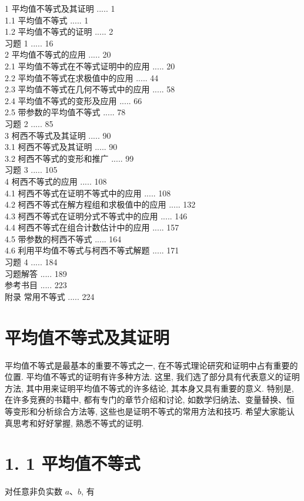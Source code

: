 1 平均值不等式及其证明 ..... 1\\
1.1 平均值不等式 ..... 1\\
1.2 平均值不等式的证明 ..... 2\\
习题 1 ..... 16\\
2 平均值不等式的应用 ..... 20\\
2.1 平均值不等式在不等式证明中的应用 ..... 20\\
2.2 平均值不等式在求极值中的应用 ..... 44\\
2.3 平均值不等式在几何不等式中的应用 ..... 58\\
2.4 平均值不等式的变形及应用 ..... 66\\
2.5 带参数的平均值不等式 ..... 78\\
习题 2 ..... 85\\
3 柯西不等式及其证明 ..... 90\\
3.1 柯西不等式及其证明 ..... 90\\
3.2 柯西不等式的变形和推广 ..... 99\\
习题 3 ..... 105\\
4 柯西不等式的应用 ..... 108\\
4.1 柯西不等式在证明不等式中的应用 ..... 108\\
4.2 柯西不等式在解方程组和求极值中的应用 ..... 132\\
4.3 柯西不等式在证明分式不等式中的应用 ..... 146\\
4.4 柯西不等式在组合计数估计中的应用 ..... 157\\
4.5 带参数的柯西不等式 ..... 164\\
4.6 利用平均值不等式与柯西不等式解题 ..... 171\\
习题 4 ..... 184\\
习题解答 ..... 189\\
参考书目 ..... 223\\
附录 常用不等式 ..... 224

\section*{平均值不等式及其证明}
平均值不等式是最基本的重要不等式之一, 在不等式理论研究和证明中占有重要的位置. 平均值不等式的证明有许多种方法. 这里, 我们选了部分具有代表意义的证明方法, 其中用来证明平均值不等式的许多结论, 其本身又具有重要的意义. 特别是, 在许多竞赛的书籍中, 都有专门的章节介绍和讨论, 如数学归纳法、变量替换、恒等变形和分析综合方法等, 这些也是证明不等式的常用方法和技巧. 希望大家能认真思考和好好掌握, 熟悉不等式的证明.

\section*{1. 1 平均值不等式}
对任意非负实数 $a 、 b$, 有

